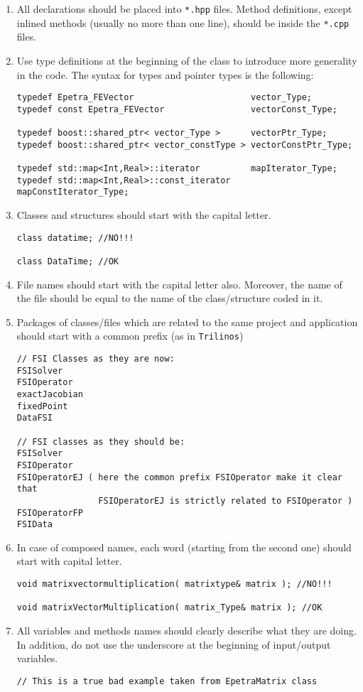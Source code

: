 \documentclass[10p]{article}
\begin{document}
\begin{enumerate}
  \item All declarations should be placed into \texttt{*.hpp} files. Method definitions, except inlined methods (usually no more than one line), should be inside the \texttt{*.cpp} files.
  \item Use type definitions at the beginning of the class to introduce more generality in the code. The syntax for types and pointer types is the following:
\begin{lstlisting}
typedef Epetra_FEVector                       vector_Type;
typedef const Epetra_FEVector                 vectorConst_Type;

typedef boost::shared_ptr< vector_Type >      vectorPtr_Type;
typedef boost::shared_ptr< vector_constType > vectorConstPtr_Type;

typedef std::map<Int,Real>::iterator          mapIterator_Type;       
typedef std::map<Int,Real>::const_iterator    mapConstIterator_Type;
\end{lstlisting}
  \item Classes and structures should start with the capital letter.
\begin{lstlisting}
class datatime; //NO!!!

class DataTime; //OK
\end{lstlisting}
  \item File names should start with the capital letter also. Moreover, the name of the file should be equal to the name of the class/structure coded in it.
  \item Packages of classes/files which are related to the same project and application should start with a common prefix
  (as in \texttt{Trilinos})
\begin{lstlisting}
// FSI Classes as they are now:
FSISolver
FSIOperator
exactJacobian
fixedPoint
DataFSI

// FSI classes as they should be:
FSISolver
FSIOperator
FSIOperatorEJ ( here the common prefix FSIOperator make it clear that 
                FSIOperatorEJ is strictly related to FSIOperator )
FSIOperatorFP
FSIData
\end{lstlisting}
  \item In case of composed names, each word (starting from the second one) should start with capital letter.
\begin{lstlisting}
void matrixvectormultiplication( matrixtype& matrix ); //NO!!!

void matrixVectorMultiplication( matrix_Type& matrix ); //OK
\end{lstlisting}
  \item All variables and methods names should clearly describe what they are doing. In addition, do not use the underscore at the beginning of input/output variables.
\begin{lstlisting}
// This is a true bad example taken from EpetraMatrix class


\end{lstlisting}
\end{enumerate}
\end{document}
